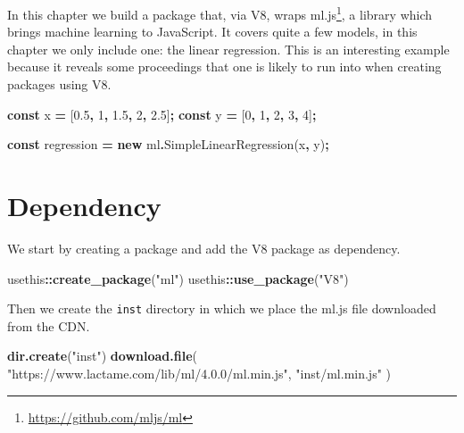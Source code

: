 \documentclass[
]{krantz}
\makeatletter
\newenvironment{Shaded}{\begin{snugshade}}{\end{snugshade}}
\newcommand{\DecValTok}[1]{\textcolor[rgb]{0.06,0.06,0.06}{#1}}
\newcommand{\FloatTok}[1]{\textcolor[rgb]{0.06,0.06,0.06}{#1}}
\newcommand{\FunctionTok}[1]{\textcolor[rgb]{0,0,0}{#1}}
\newcommand{\KeywordTok}[1]{\textcolor[rgb]{0.27,0.27,0.27}{\textbf{#1}}}
\newcommand{\NormalTok}[1]{#1}
\newcommand{\OperatorTok}[1]{\textcolor[rgb]{0.43,0.43,0.43}{\textbf{#1}}}
\newcommand{\StringTok}[1]{\textcolor[rgb]{0.5,0.5,0.5}{#1}}
\renewcommand{\href}[2]{#2\footnote{\url{#1}}}
\newenvironment{kframe}{%
\medskip{}
\setlength{\fboxsep}{.8em}
 \def\at@end@of@kframe{}%
 \ifinner\ifhmode%
  \def\at@end@of@kframe{\end{minipage}}%
  \begin{minipage}{\columnwidth}%
 \fi\fi%
 \def\FrameCommand##1{\hskip\@totalleftmargin \hskip-\fboxsep
 \colorbox{shadecolor}{##1}\hskip-\fboxsep
     \hskip-\linewidth \hskip-\@totalleftmargin \hskip\columnwidth}%
 \MakeFramed {\advance\hsize-\width
   \@totalleftmargin\z@ \linewidth\hsize
   \@setminipage}}%
 {\par\unskip\endMakeFramed%
 \at@end@of@kframe}
\renewenvironment{Shaded}{\begin{kframe}}{\end{kframe}}
\makeatother
\begin{document}
In this chapter we build a package that, via V8, wraps \href{https://github.com/mljs/ml}{ml.js}, a library which brings machine learning to JavaScript. It covers quite a few models, in this chapter we only include one: the linear regression. This is an interesting example because it reveals some proceedings that one is likely to run into when creating packages using V8.

\begin{Shaded}
\begin{Highlighting}[]
\KeywordTok{const}\NormalTok{ x }\OperatorTok{=}\NormalTok{ [}\FloatTok{0.5}\OperatorTok{,} \DecValTok{1}\OperatorTok{,} \FloatTok{1.5}\OperatorTok{,} \DecValTok{2}\OperatorTok{,} \FloatTok{2.5}\NormalTok{]}\OperatorTok{;}
\KeywordTok{const}\NormalTok{ y }\OperatorTok{=}\NormalTok{ [}\DecValTok{0}\OperatorTok{,} \DecValTok{1}\OperatorTok{,} \DecValTok{2}\OperatorTok{,} \DecValTok{3}\OperatorTok{,} \DecValTok{4}\NormalTok{]}\OperatorTok{;}

\KeywordTok{const}\NormalTok{ regression }\OperatorTok{=} \KeywordTok{new}\NormalTok{ ml}\OperatorTok{.}\FunctionTok{SimpleLinearRegression}\NormalTok{(x}\OperatorTok{,}\NormalTok{ y)}\OperatorTok{;}
\end{Highlighting}
\end{Shaded}

\hypertarget{v8-ml-dependency}{%
\section{Dependency}\label{v8-ml-dependency}}

We start by creating a package and add the V8 package as dependency.

\begin{Shaded}
\begin{Highlighting}[]
\NormalTok{usethis}\OperatorTok{::}\KeywordTok{create\_package}\NormalTok{(}\StringTok{"ml"}\NormalTok{)}
\NormalTok{usethis}\OperatorTok{::}\KeywordTok{use\_package}\NormalTok{(}\StringTok{"V8"}\NormalTok{)}
\end{Highlighting}
\end{Shaded}

Then we create the \texttt{inst} directory in which we place the ml.js file downloaded from the CDN.

\begin{Shaded}
\begin{Highlighting}[]
\KeywordTok{dir.create}\NormalTok{(}\StringTok{"inst"}\NormalTok{)}
\KeywordTok{download.file}\NormalTok{(}
  \StringTok{"https://www.lactame.com/lib/ml/4.0.0/ml.min.js"}\NormalTok{, }
  \StringTok{"inst/ml.min.js"}
\NormalTok{)}
\end{Highlighting}
\end{Shaded}
\end{document}
